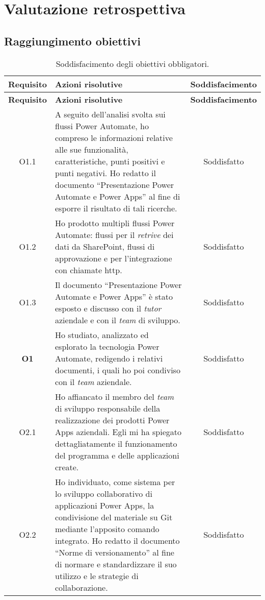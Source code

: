 \chapter{Valutazione retrospettiva}
\label{cap:valutazioneRetrospettiva}

\section{Raggiungimento obiettivi}
\begin{longtable}{|c|p{7cm}|c|}
    \caption{Soddisfacimento degli obiettivi obbligatori.}
    \label{tab:soddObbObbligatori}\\
    \hline \textbf{Requisito} & \textbf{Azioni risolutive} & \textbf{Soddisfacimento}\\ \endfirsthead
    \hline \textbf{Requisito} & \textbf{Azioni risolutive} & \textbf{Soddisfacimento}\\ \endhead
    \hline \endfoot
    \hline \endlastfoot
    \hline O1.1  & A seguito dell'analisi svolta sui flussi Power Automate, ho compreso le informazioni relative alle sue funzionalità, caratteristiche, punti positivi e punti negativi. Ho redatto il documento “Presentazione Power Automate e Power Apps” al fine di esporre il risultato di tali ricerche. & Soddisfatto\\
    \hline O1.2  & Ho prodotto multipli flussi Power Automate: flussi per il \emph{retrive} dei dati da SharePoint, flussi di approvazione e per l'integrazione con chiamate \gls{http}. & Soddisfatto\\
    \hline O1.3  & Il documento “Presentazione Power Automate e Power Apps” è stato esposto e discusso con il \emph{tutor} aziendale e con il \emph{team} di sviluppo. & Soddisfatto\\
    \hline \textbf{O1}    & Ho studiato, analizzato ed esplorato la tecnologia Power Automate, redigendo i relativi documenti, i quali ho poi condiviso con il \emph{team} aziendale. & Soddisfatto\\
    \hline O2.1  & Ho affiancato il membro del \emph{team} di sviluppo responsabile della realizzazione dei prodotti Power Apps aziendali. Egli mi ha spiegato dettagliatamente il funzionamento del programma e delle applicazioni create. & Soddisfatto\\
    \hline O2.2  & Ho individuato, come sistema per lo sviluppo collaborativo di applicazioni Power Apps, la condivisione del materiale su Git mediante l'apposito comando integrato. Ho redatto il documento “Norme di versionamento” al fine di normare e standardizzare il suo utilizzo e le strategie di collaborazione. & Soddisfatto\\

\end{longtable}
